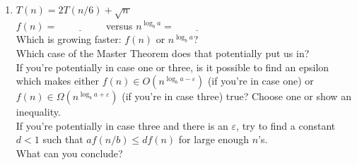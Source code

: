 \documentclass[12 pt]{amsart}
\renewcommand{\epsilon}{\varepsilon}
\begin{document}
\begin{enumerate}[label=\arabic*.)]
	\item $T(n) = 2T(n/6) + \sqrt{n\,}$ \\
	$f(n) = \underline{\phantom{xxxxxxxx}}$ versus $n^{\log_b a} = \underline{\phantom{xxxxxxxx}}$ \\
	Which is growing faster: $f(n)$ or  $n^{\log_b a}$?  \underline{\phantom{xxxxxxxxxxx}} \\
	Which case of the Master Theorem does that potentially put us in?  \underline{\phantom{xxxx}} \\
	If you're potentially in case one or three, is it possible to find an epsilon which makes either $f(n) \in O(n^{\log_b a - \epsilon})$ (if you're in case one) or $f(n) \in \Omega(n^{\log_b a+ \epsilon})$ (if you're in case three) true? Choose one or show an inequality. \underline{\phantom{xxxxx}} \\
	If you're potentially in case three and there is an $\epsilon$, try to find a constant $d<1$ such that $a f(n/b) \leq d f(n)$ for large enough $n$'s.
	\underline{\phantom{xxxxxxxxxxxxxxx}}\\
	What can you conclude? \underline{\phantom{xxxxxxxxxxxxxxx}}
	
\end{enumerate}
\end{document}
